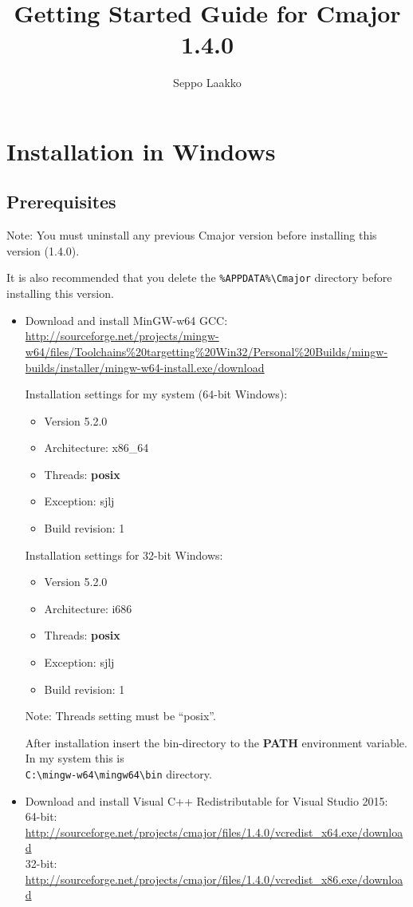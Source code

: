 \documentclass[oneside, a4paper, 11pt]{article}
\begin{document}
\title{Getting Started Guide for Cmajor 1.4.0}
\author{Seppo Laakko}
\maketitle

\section{Installation in Windows}

\subsection{Prerequisites}

Note:
You must uninstall any previous Cmajor version before installing
this version (1.4.0).

It is also recommended that you delete the
\verb|%APPDATA%\Cmajor| directory before installing
this version.

\begin{itemize}

\item
Download and install MinGW-w64 GCC:\\
\url{http://sourceforge.net/projects/mingw-w64/files/Toolchains%20targetting%20Win32/Personal%20Builds/mingw-builds/installer/mingw-w64-install.exe/download}

Installation settings for my system (64-bit Windows):
\begin{itemize}
\item
Version 5.2.0
\item
Architecture: x86\_64
\item
Threads: \textbf{posix}
\item
Exception: sjlj
\item
Build revision: 1
\end{itemize}

Installation settings for 32-bit Windows:
\begin{itemize}
\item
Version 5.2.0
\item
Architecture: i686
\item
Threads: \textbf{posix}
\item
Exception: sjlj
\item
Build revision: 1
\end{itemize}

Note: Threads setting must be ``posix''.

After installation insert the bin-directory to the \textbf{PATH} environment variable.
In my system this is\\
\verb|C:\mingw-w64\mingw64\bin| directory.

\item
Download and install Visual C++ Redistributable for Visual Studio 2015:\\
64-bit: \url{http://sourceforge.net/projects/cmajor/files/1.4.0/vcredist_x64.exe/download}\\
32-bit: \url{http://sourceforge.net/projects/cmajor/files/1.4.0/vcredist_x86.exe/download}
\end{itemize}
\end{document}
